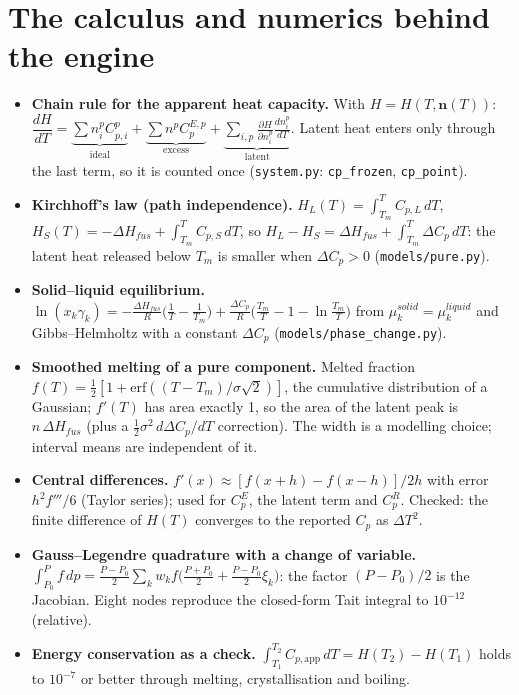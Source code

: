 \documentclass[11pt,a4paper]{article}
\newcommand{\code}[1]{\texttt{\small #1}}
\begin{document}
\section{The calculus and numerics behind the engine}
\begin{itemize}
\item \textbf{Chain rule for the apparent heat capacity.} With $H=H(T,\mathbf n(T))$:
$\dfrac{dH}{dT}=\underbrace{\sum n_i^pC_{p,i}^p}_{\text{ideal}}+\underbrace{\sum n^pC_p^{E,p}}_{\text{excess}}
+\underbrace{\sum_{i,p}\frac{\partial H}{\partial n_i^p}\frac{dn_i^p}{dT}}_{\text{latent}}$.
Latent heat enters only through the last term, so it is counted once
(\code{system.py}: \code{cp\_frozen}, \code{cp\_point}).
\item \textbf{Kirchhoff's law (path independence).} $H_L(T)=\int_{T_m}^TC_{p,L}\,dT$,
$H_S(T)=-\Delta H_{fus}+\int_{T_m}^TC_{p,S}\,dT$, so $H_L-H_S=\Delta H_{fus}+\int_{T_m}^T\Delta C_p\,dT$: the
latent heat released below $T_m$ is smaller when $\Delta C_p>0$ (\code{models/pure.py}).
\item \textbf{Solid--liquid equilibrium.} $\ln(x_k\gamma_k)=-\frac{\Delta H_{fus}}{R}\big(\frac1T-\frac1{T_m}\big)
+\frac{\Delta C_p}{R}\big(\frac{T_m}T-1-\ln\frac{T_m}T\big)$ from $\mu_k^{solid}=\mu_k^{liquid}$ and
Gibbs--Helmholtz with a constant $\Delta C_p$ (\code{models/phase\_change.py}).
\item \textbf{Smoothed melting of a pure component.} Melted fraction
$f(T)=\tfrac12[1+\mathrm{erf}((T-T_m)/\sigma\sqrt2)]$, the cumulative distribution of a Gaussian; $f'(T)$ has
area exactly 1, so the area of the latent peak is $n\,\Delta H_{fus}$ (plus a $\tfrac12\sigma^2\,d\Delta
C_p/dT$ correction). The width is a modelling choice; interval means are independent of it.
\item \textbf{Central differences.} $f'(x)\approx[f(x+h)-f(x-h)]/2h$ with error $h^2f'''/6$ (Taylor series);
used for $C_p^E$, the latent term and $C_p^R$. Checked: the finite difference of $H(T)$ converges to the
reported $C_p$ as $\Delta T^2$.
\item \textbf{Gauss--Legendre quadrature with a change of variable.} $\int_{P_0}^{P}f\,dp=\frac{P-P_0}{2}\sum_k
w_kf\big(\tfrac{P+P_0}2+\tfrac{P-P_0}2\xi_k\big)$: the factor $(P-P_0)/2$ is the Jacobian. Eight nodes reproduce
the closed-form Tait integral to $10^{-12}$ (relative).
\item \textbf{Energy conservation as a check.} $\int_{T_1}^{T_2}C_{p,\mathrm{app}}\,dT=H(T_2)-H(T_1)$ holds to
$10^{-7}$ or better through melting, crystallisation and boiling.
\end{itemize}
\end{document}
